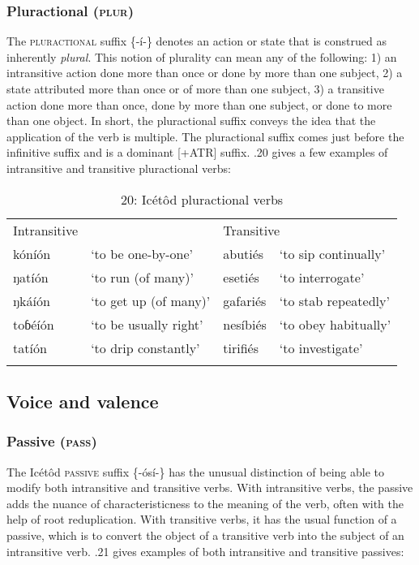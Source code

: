 \subsubsection{Pluractional (\textsc{plur})}

The \textsc{pluractional} suffix \{-í-\} denotes an action or state that is construed as inherently \textit{plural}. This notion of plurality can mean any of the following: 1) an intransitive action done more than once or done by more than one subject, 2) a state attributed more than once or of more than one subject, 3) a transitive action done more than once, done by more than one subject, or done to more than one object. In short, the pluractional suffix conveys the idea that the application of the verb is multiple. The pluractional suffix comes just before the infinitive suffix and is a dominant [+ATR] suffix. .20 gives a few examples of intransitive and transitive pluractional verbs:


\begin{table}
\caption{20: Icétôd pluractional verbs}
\label{tab:8}


\begin{tabularx}{\textwidth}{XXXX}
\lsptoprule

Intransitive &  & \multicolumn{2}{X}{Transitive}\\
kóníón & ‘to be one-by-one’ & abutiés & ‘to sip continually’\\
ŋatíón & ‘to run (of many)’ & esetiés & ‘to interrogate’\\
ŋkáíón & ‘to get up (of many)’ & gafariés & ‘to stab repeatedly’\\
toɓéíón & ‘to be usually right’ & nesíbiés & ‘to obey habitually’\\
tatíón & ‘to drip constantly’ & tirifiés & ‘to investigate’\\
\lspbottomrule
\end{tabularx}
\end{table}



\subsection{Voice and valence}
\subsubsection{Passive (\textsc{pass})}

The Icétôd \textsc{passive} suffix \{-ósí-\} has the unusual distinction of being able to modify both intransitive and transitive verbs. With intransitive verbs, the passive adds the nuance of characteristicness to the meaning of the verb, often with the help of root reduplication. With transitive verbs, it has the usual function of a passive, which is to convert the object of a transitive verb into the subject of an intransitive verb. .21 gives examples of both intransitive and transitive passives:


